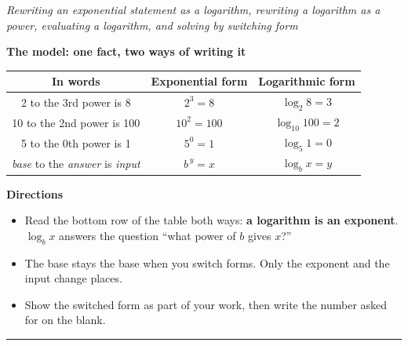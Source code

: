 \documentclass[12pt]{article}
\begin{document}

\begin{center}
\textit{Rewriting an exponential statement as a logarithm, rewriting a logarithm as a power, evaluating a logarithm, and solving by switching form}
\end{center}

\noindent\textbf{The model: one fact, two ways of writing it}

\begin{center}
\begin{tabular}{|c|c|c|}
\hline
\textbf{In words} & \textbf{Exponential form} & \textbf{Logarithmic form} \\
\hline
2 to the 3rd power is 8 & $2^3 = 8$ & $\log_2 8 = 3$ \\
\hline
10 to the 2nd power is 100 & $10^2 = 100$ & $\log_{10} 100 = 2$ \\
\hline
5 to the 0th power is 1 & $5^0 = 1$ & $\log_5 1 = 0$ \\
\hline
\textit{base} to the \textit{answer} is \textit{input} & $b^{\,y} = x$ & $\log_b x = y$ \\
\hline
\end{tabular}
\end{center}

\noindent\textbf{Directions}
\begin{itemize}[leftmargin=1.1cm, itemsep=1pt, topsep=3pt]
  \item Read the bottom row of the table both ways: \textbf{a logarithm is an exponent}. $\log_b x$ answers the question ``what power of $b$ gives $x$?''
  \item The base stays the base when you switch forms. Only the exponent and the input change places.
  \item Show the switched form as part of your work, then write the number asked for on the blank.
\end{itemize}

\vspace{0.2cm}
\noindent\rule{\linewidth}{0.4pt}



\end{document}
